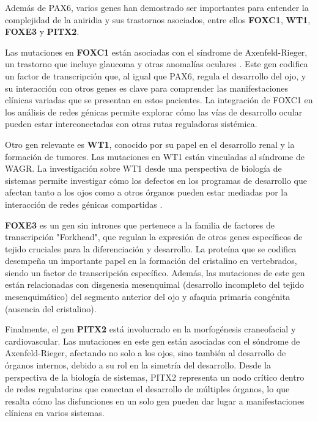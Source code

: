 Además de PAX6, varios genes han demostrado ser importantes para entender la
complejidad de la aniridia y sus trastornos asociados, entre ellos \textbf{FOXC1}, \textbf{WT1},
\textbf{FOXE3} y \textbf{PITX2}.

Las mutaciones en \textbf{FOXC1} \cite{NCBIGeneFOXC1}  están asociadas con el síndrome de Axenfeld-Rieger,
un trastorno que incluye glaucoma y otras anomalías oculares \cite{Reis2023}. Este gen codifica un factor de transcripción que, al igual que PAX6, regula
el desarrollo del ojo, y su interacción con otros genes es clave para comprender las
manifestaciones clínicas variadas que se presentan en estos pacientes. La integración
de FOXC1 en los análisis de redes génicas permite explorar cómo las vías de desarrollo ocular pueden estar interconectadas con otras rutas reguladoras sistémica.


Otro gen relevante es \textbf{WT1}, conocido por su papel en el desarrollo renal y la formación de tumores. Las mutaciones en WT1 están vinculadas al síndrome de
WAGR. La investigación sobre WT1 desde una perspectiva de biología de sistemas permite investigar cómo los defectos en los programas de desarrollo que afectan
tanto a los ojos como a otros órganos pueden estar mediadas por la interacción de redes génicas compartidas \cite{Pelletier1991}.

\textbf{FOXE3} es un gen sin intrones que pertenece a la familia de factores de transcripción "Forkhead", que regulan la expresión de otros genes específicos de tejido cruciales para la diferenciación y desarrollo. La proteína que se codifica desempeña un importante papel en la formación del cristalino en vertebrados, siendo un factor de transcripción específico. Además, las mutaciones de este gen están relacionadas con disgenesia mesenquimal (desarrollo incompleto del tejido mesenquimático) del segmento anterior del ojo y afaquia primaria congénita (ausencia del cristalino).


Finalmente, el gen \textbf{PITX2} está involucrado en la morfogénesis craneofacial y cardiovascular. Las mutaciones en este gen están asociadas con el sóndrome de Axenfeld-Rieger, afectando no solo a los ojos, sino también al desarrollo de órganos internos, debido a su rol en la simetría del desarrollo\cite{French2021}. Desde la
perspectiva de la biología de sistemas, PITX2 representa un nodo crítico dentro de redes regulatorias que conectan el desarrollo de múltiples órganos, lo que resalta cómo las disfunciones en un solo gen pueden dar lugar a manifestaciones clínicas en varios sistemas.


